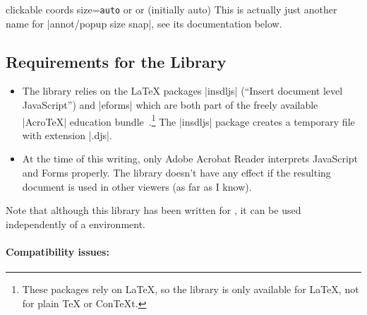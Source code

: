 \begin{pgfplotskey}{%
    clickable coords size=\texttt{auto} or  or
     (initially auto)%
}
    This is actually just another name for |annot/popup size snap|, see its
    documentation below.
\end{pgfplotskey}


\subsection{Requirements for the Library}

\begin{itemize}
    \item The library relies on the \LaTeX{} packages |insdljs| (``Insert
        document level JavaScript'') and |eforms| which are both part of the
        freely available |AcroTeX| education
        bundle~\cite{acrotex}.\footnote{These packages rely on \LaTeX{}, so
        the library is only available for \LaTeX{}, not for plain \TeX{} or
        Con\TeX{}t.} The |insdljs| package creates a temporary file with
        extension |.djs|.
    \item At the time of this writing, only Adobe Acrobat Reader interprets
        JavaScript and Forms properly. The library doesn't have any effect if
        the resulting document is used in other viewers (as far as I know).
\end{itemize}
%
Note that although this library has been written for \PGFPlots{}, it can be
used independently of a \PGFPlots{} environment.


\paragraph{Compatibility issues:}

